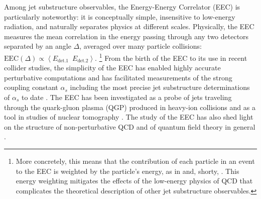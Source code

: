 Among jet substructure observables, the Energy-Energy Correlator (EEC) \cite{Basham:1978bw,Basham:1978zq,Basham:1979gh} is particularly noteworthy:
%
it is conceptually simple, insensitive to low-energy radiation, and naturally separates physics at different scales.
%
Physically, the EEC measures the mean correlation in the energy passing through any two detectors separated by an angle \(\Delta\), averaged over many particle collisions:
%
\(
    \text{EEC}(\Delta)
    \propto
    \left\langle
        E_\text{det.\.1} \,\,\, E_\text{det.\.2}
    \right\rangle
\).%
\footnote{
    More concretely, this means that the contribution of each particle in an event to the EEC is weighted by the particle's energy,
    as in  and, shorty, .
    This energy weighting mitigates the effects of the low-energy physics of QCD that complicates the theoretical description of other jet substructure observables.
}
%
From the birth of the EEC to its use in recent collider studies, the simplicity of the EEC has enabled highly accurate perturbative computations \cite{Clay:1995sd,Glover:1994vz,Kramer:1996qr,DelDuca:2016csb,Gituliar:2017umx,Dixon:2018tpg,Dixon:2018qgp,Henn:2019gkr,Luo:2019nig,Gao:2020vyx,Neill:2022lqx,Lee:2023npz,Kramer:1995qh,deFlorian:2004mp,Banfi:2002vw,Tulipant:2017ybb,Moult:2018jzp,Korchemsky:2019nzm,Dixon:2019uzg,Gao:2019ojf,Luo:2019hmp,Luo:2019bmw,Moult:2019vou,Li:2020bub,Ebert:2020sfi,Li:2021txc,Duhr:2022yyp,Chen:2023zlx,Gao:2023ivm} and has facilitated measurements of the strong coupling constant \(\alpha_s\) \cite{Martin:1986uq,DELPHI:1990sof,SLD:1994yoe,ATLAS:2015yaa,ATLAS:2017qir,dEnterria:2018cye,Kardos:2018kqj,Ali:2020ksn,dEnterria:2022hzv,ATLAS:2023tgo} including the most precise jet substructure determinations of \(\alpha_s\) to date \cite{CMS:2024mlf}.
%
The EEC has been investigated as a probe of jets traveling through the quark-gluon plasma (QGP) produced in heavy-ion collisions \cite{Lokhtin:2004tx,Lokhtin:2006dp,Andres:2022ovj,Barata:2023zqg,Andres:2023xwr,Yang:2023dwc,Barata:2023vnl,Barata:2023bhh,Barata:2024nqo} and as a tool in studies of nuclear tomography \cite{Karapetyan:2019fst,Liu:2022wop,Liu:2023aqb,Kang:2023gvg,Cao:2023oef}.
%
The study of the EEC has also shed light on the structure of non-perturbative QCD \cite{Nason:1995np,Korchemsky:1997sy,Korchemsky:1999kt,Dokshitzer:1999sh,Chen:2020vvp,Jaarsma:2023ell,Schindler:2023cww,Lee:2024esz}
and of quantum field theory in general \cite{Richards:1983sr,Sveshnikov:1995vi,Hofman:2008ar,Hatta:2012kn,Belitsky:2013bja,Belitsky:2013ofa,Belitsky:2013xxa,Belitsky:2014zha,Korchemsky:2015ssa,Goncalves:2014ffa,Farnsworth:2015hum,Hofman:2016awc,Kravchuk:2018htv,Kologlu:2019mfz,Chang:2020qpj,Korchemsky:2021htm,Caron-Huot:2022eqs,Chen:2023wah,Chicherin:2023gxt,Chicherin:2024ifn}.

